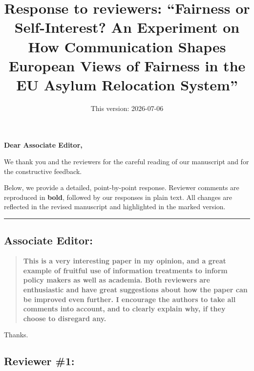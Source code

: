 \documentclass[
  11pt,
]{article}
\title{Response to reviewers: ``Fairness or Self-Interest? An Experiment on How Communication Shapes European Views of Fairness in the EU Asylum Relocation System''}
\author{}
\date{\vspace{-2.5em}This version: 2026-07-06}
\begin{document}
\maketitle

\textbf{Dear Associate Editor,}

We thank you and the reviewers for the careful reading of our manuscript and for the constructive feedback.

Below, we provide a detailed, point-by-point response. Reviewer comments are reproduced in \textbf{bold}, followed by our responses in plain text. All changes are reflected in the revised manuscript and highlighted in the marked version.

\begin{center}\rule{0.5\linewidth}{0.5pt}\end{center}

\subsection{Associate Editor:}\label{associate-editor}

\begin{quote}
\textbf{This is a very interesting paper in my opinion, and a great example of fruitful use of information treatments to inform policy makers as well as academia. Both reviewers are enthusiastic and have great suggestions about how the paper can be improved even further. I encourage the authors to take all comments into account, and to clearly explain why, if they choose to disregard any.}
\end{quote}

Thanks.

\subsection{Reviewer \#1:}\label{reviewer-1}
\end{document}
